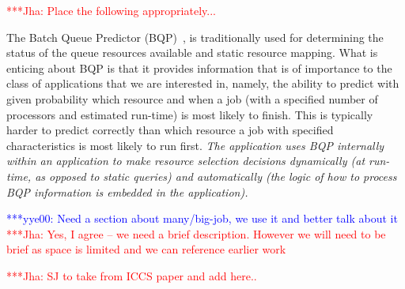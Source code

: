\documentclass[conference,final]{IEEEtran}
\newcommand{\jhanote}[1]{ {\textcolor{red} { ***Jha: #1 }}}
\newcommand{\yyenote}[1]{ {\textcolor{blue} { ***yye00: #1 }}}
\newcommand{\jhanote}[1]{}
\newcommand{\yyenote}[1]{}
\begin{document}

\jhanote{Place the following appropriately...}

 The Batch
Queue Predictor (BQP)~\cite{bqp, bqp_url}, is traditionally used for
determining the status of the queue resources available and static
resource mapping. What is enticing about BQP is that it provides
information that is of importance to the class of applications that we
are interested in, namely, the ability to predict with given
probability which resource and when a job (with a specified number of
processors and estimated run-time) is most likely to finish.  This is
typically harder to predict correctly than which resource a job with
specified characteristics is most likely to run first.  {\it The
  application uses BQP internally within an application to make
  resource selection decisions dynamically (at run-time, as opposed to
  static queries) and automatically (the logic of how to process BQP
  information is embedded in the application).}

\yyenote{Need a section about many/big-job, we use it and better talk
  about it} \jhanote{Yes, I agree -- we need a brief
  description. However we will need to be brief as space is limited
  and we can reference earlier work}

\jhanote{SJ to take from ICCS paper and add here..}
\end{document}
